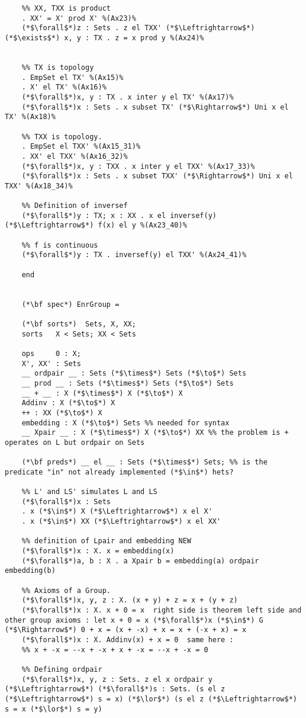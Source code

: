 \documentclass[preview]{standalone}
\begin{document}
\begin{lstlisting}
	%% XX, TXX is product
	. XX' = X' prod X' %(Ax23)%
	(*$\forall$*)z : Sets . z el TXX' (*$\Leftrightarrow$*) (*$\exists$*) x, y : TX . z = x prod y %(Ax24)%
	
	
	%% TX is topology
	. EmpSet el TX' %(Ax15)%
	. X' el TX' %(Ax16)%
	(*$\forall$*)x, y : TX . x inter y el TX' %(Ax17)%
	(*$\forall$*)x : Sets . x subset TX' (*$\Rightarrow$*) Uni x el TX' %(Ax18)%
	
	%% TXX is topology.
	. EmpSet el TXX' %(Ax15_31)%
	. XX' el TXX' %(Ax16_32)%
	(*$\forall$*)x, y : TXX . x inter y el TXX' %(Ax17_33)%
	(*$\forall$*)x : Sets . x subset TXX' (*$\Rightarrow$*) Uni x el TXX' %(Ax18_34)%
	
	%% Definition of inversef
	(*$\forall$*)y : TX; x : XX . x el inversef(y) (*$\Leftrightarrow$*) f(x) el y %(Ax23_40)%
	
	%% f is continuous
	(*$\forall$*)y : TX . inversef(y) el TXX' %(Ax24_41)%
	
	end
	
	
	(*\bf spec*) EnrGroup =
	
	(*\bf sorts*)  Sets, X, XX;
	sorts	X < Sets; XX < Sets
	
	ops 	0 : X;
	X', XX' : Sets
	__ ordpair __ : Sets (*$\times$*) Sets (*$\to$*) Sets
	__ prod __ : Sets (*$\times$*) Sets (*$\to$*) Sets
	__ + __ : X (*$\times$*) X (*$\to$*) X
	Addinv : X (*$\to$*) X
	++ : XX (*$\to$*) X
	embedding : X (*$\to$*) Sets %% needed for syntax
	__ Xpair __ : X (*$\times$*) X (*$\to$*) XX %% the problem is + operates on L but ordpair on Sets
	
	(*\bf preds*) __ el __ : Sets (*$\times$*) Sets; %% is the predicate "in" not already implemented (*$\in$*) hets?
	
	%% L' and LS' simulates L and LS
	(*$\forall$*)x : Sets
	. x (*$\in$*) X (*$\Leftrightarrow$*) x el X'
	. x (*$\in$*) XX (*$\Leftrightarrow$*) x el XX'
	
	%% definition of Lpair and embedding NEW
	(*$\forall$*)x : X. x = embedding(x)
	(*$\forall$*)a, b : X . a Xpair b = embedding(a) ordpair embedding(b)
	
	%% Axioms of a Group.
	(*$\forall$*)x, y, z : X. (x + y) + z = x + (y + z)
	(*$\forall$*)x : X. x + 0 = x  right side is theorem left side and other group axioms : let x + 0 = x (*$\forall$*)x (*$\in$*) G (*$\Rightarrow$*) 0 + x = (x + -x) + x = x + (-x + x) = x 
	(*$\forall$*)x : X. Addinv(x) + x = 0  same here : 
	%% x + -x = --x + -x + x + -x = --x + -x = 0
	
	%% Defining ordpair
	(*$\forall$*)x, y, z : Sets. z el x ordpair y (*$\Leftrightarrow$*) (*$\forall$*)s : Sets. (s el z (*$\Leftrightarrow$*) s = x) (*$\lor$*) (s el z (*$\Leftrightarrow$*) s = x (*$\lor$*) s = y)
	

\end{lstlisting}
\end{document}
